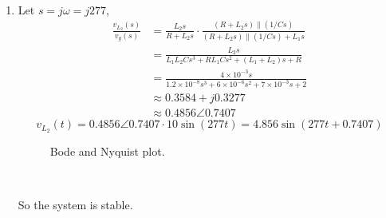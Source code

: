 \documentclass{article}
\newcommand{\inputmintedindent}[2]{
\begin{minipage}{0.1\linewidth}\end{minipage}
\begin{minipage}{0.85\linewidth}\inputminted{#1}{#2}\end{minipage}\\[0.5em]
}
\begin{document}
\inputmintedindent{matlab}{p1.m}

\section{}
\begin{enumerate}
\item
Let $s=j\omega=j277$,
\begin{align*}
\frac{v_{L_2}(s)}{v_g(s)}
&=\frac{L_2s}{R+L_2s}\cdot\frac{(R+L_2s)\parallel(1/Cs)}{(R+L_2s)\parallel(1/Cs)+L_1s}\\
&=\frac{L_2s}{L_1L_2Cs^3+RL_1Cs^2+(L_1+L_2)s+R}\\
&=\frac{4\times10^{-3}s}{1.2\times10^{-8}s^3+6\times10^{-6}s^2+7\times10^{-3}s+2}\\
&\approx0.3584 + j0.3277\\
&\approx0.4856 \angle 0.7407
\end{align*}
$$v_{L_2}(t)=0.4856 \angle 0.7407 \cdot 10\sin(277t)=4.856\sin(277t+0.7407)$$

\begin{figure}[!htbp]
	\centering
	\caption{Bode and Nyquist plot.}
\end{figure}

\inputmintedindent{matlab}{p2_1.m}

So the system is stable.

\newpage


\end{enumerate}
\end{document}
